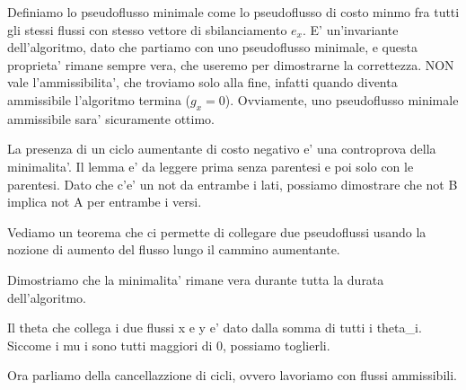 Definiamo lo pseudoflusso minimale come lo pseudoflusso di costo minmo fra tutti gli stessi flussi con stesso vettore di sbilanciamento $ e_x $. E' un'invariante dell'algoritmo, dato che partiamo con uno pseudoflusso minimale, e questa proprieta' rimane sempre vera, che useremo per dimostrarne la correttezza. NON vale l'ammissibilita', che troviamo solo alla fine, infatti quando diventa ammissibile l'algoritmo termina ($ g_x = 0 $). Ovviamente, uno pseudoflusso minimale ammissibile sara' sicuramente ottimo. 

La presenza di un ciclo aumentante di costo negativo e' una controprova della minimalita'. Il lemma e' da leggere prima senza parentesi e poi solo con le parentesi. Dato che c'e' un not da entrambe i lati, possiamo dimostrare che not B implica not A per entrambe i versi.

Vediamo un teorema che ci permette di collegare due pseudoflussi usando la nozione di aumento del flusso lungo il cammino aumentante. 

Dimostriamo che la minimalita' rimane vera durante tutta la durata dell'algoritmo.

Il theta che collega i due flussi x e y e' dato dalla somma di tutti i theta_i. Siccome i mu i sono tutti maggiori di 0, possiamo toglierli.

Ora parliamo della cancellazzione di cicli, ovvero lavoriamo con flussi ammissibili.
